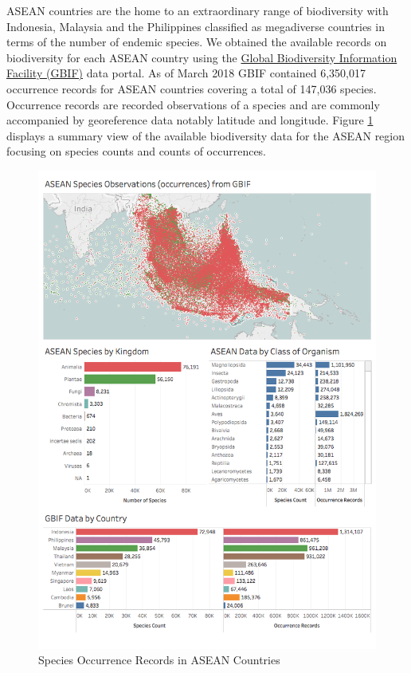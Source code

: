 \documentclass[]{book}
\theoremstyle{definition}
\theoremstyle{definition}
\theoremstyle{definition}
\theoremstyle{remark}
\begin{document}
ASEAN countries are the home to an extraordinary range of biodiversity
with Indonesia, Malaysia and the Philippines classified as megadiverse
countries in terms of the number of endemic species. We obtained the
available records on biodiversity for each ASEAN country using the
\href{https://www.gbif.org/}{Global Biodiversity Information Facility
(GBIF)} data portal. As of March 2018 GBIF contained 6,350,017
occurrence records for ASEAN countries covering a total of 147,036
species. Occurrence records are recorded observations of a species and
are commonly accompanied by georeference data notably latitude and
longitude. Figure \ref{fig:biodiv} displays a summary view of the
available biodiversity data for the ASEAN region focusing on species
counts and counts of occurrences.

\begin{figure}

{\centering \includegraphics[width=1\linewidth]{images/asean_biodiversity} 

}

\caption{Species Occurrence Records in ASEAN Countries}\label{fig:biodiv}
\end{figure}
\end{document}
